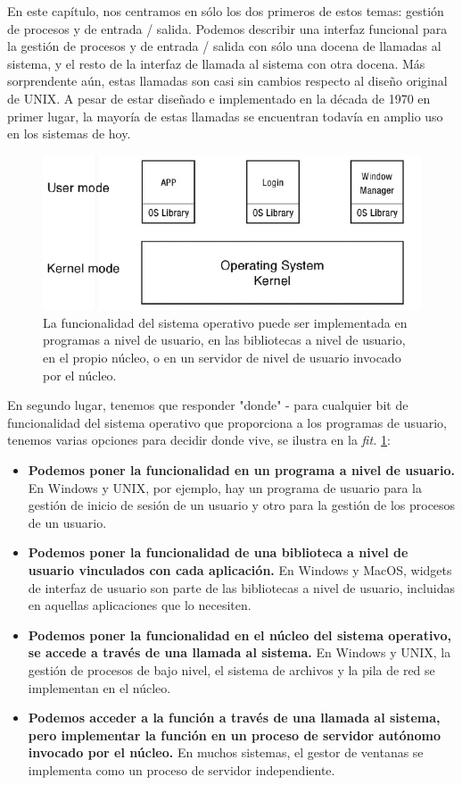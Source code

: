 \documentclass[10pt]{book}
\begin{document}
En este capítulo, nos centramos en sólo los dos primeros de estos temas: gestión de procesos y de entrada / salida. Podemos describir una interfaz funcional para la gestión de procesos y de entrada / salida con sólo una docena de llamadas al sistema, y el resto de la interfaz de llamada al sistema con otra docena. Más sorprendente aún, estas llamadas son casi sin cambios respecto al diseño original de UNIX. A pesar de estar diseñado e implementado en la década de 1970 en primer lugar, la mayoría de estas llamadas se encuentran todavía en amplio uso en los sistemas de hoy.

\begin{figure}[tbhp]
\centerline{\includegraphics[scale=0.45]{img/fig12}}
\caption{La funcionalidad del sistema operativo puede ser implementada en programas a nivel de usuario, en las bibliotecas a nivel de usuario, en el propio núcleo, o en un servidor de nivel de usuario invocado por el núcleo.}
\label{fig12}
\end{figure}

En segundo lugar, tenemos que responder "donde" - para cualquier bit de funcionalidad del sistema operativo que proporciona a los programas de usuario, tenemos varias opciones para decidir donde vive, se ilustra en la \textit{fit.} \ref{fig12}:

\begin{itemize}
\item \textbf{Podemos poner la funcionalidad en un programa a nivel de usuario.} En Windows y UNIX, por ejemplo, hay un programa de usuario para la gestión de inicio de sesión de un usuario y otro para la gestión de los procesos de un usuario.

\item \textbf{Podemos poner la funcionalidad de una biblioteca a nivel de usuario vinculados con cada aplicación.} En Windows y MacOS, widgets de interfaz de usuario son parte de las bibliotecas a nivel de usuario, incluidas en aquellas aplicaciones que lo necesiten.

\item \textbf{Podemos poner la funcionalidad en el núcleo del sistema operativo, se accede a través de una llamada al sistema.} En Windows y UNIX, la gestión de procesos de bajo nivel, el sistema de archivos y la pila de red se implementan en el núcleo.

\item \textbf{Podemos acceder a la función a través de una llamada al sistema, pero implementar la función en un proceso de servidor autónomo invocado por el núcleo.} En muchos sistemas, el gestor de ventanas se implementa como un proceso de servidor independiente.
\end{itemize}
\end{document}
